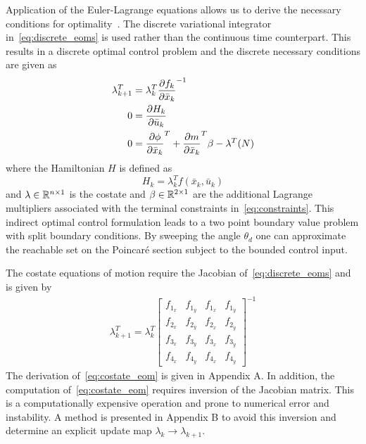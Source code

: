 \documentclass[letterpaper, preprint, paper,11pt]{AAS}	%
\begin{document}
Application of the Euler-Lagrange equations allows us to derive the necessary conditions for optimality~\cite{bryson1975}.
The discrete variational integrator in~\cref{eq:discrete_eoms} is used rather than the continuous time counterpart. 
This results in a discrete optimal control problem and the discrete necessary conditions are given as
\begin{subequations}\label{eq:necc_cond}
\begin{align}
	\lambda_{k+1}^T &= \lambda_k^T  \frac{\partial f_k}{\partial \bar{x}_k}^{-1} \\
	0 &=  \frac{\partial H_k}{\partial \bar{u}_k} \\
	0 &= \frac{\partial \phi}{\partial \bar{x}_k}^T + \frac{\partial m}{\partial \bar{x}_k}^T\beta  - \lambda^T(N)  
\end{align}
\end{subequations}
where the Hamiltonian \(H\) is defined as
\begin{equation}
	H_k = \lambda_k^T f(\bar{x}_k, \bar{u}_k) 
	\label{eq:hamiltonian_opt}
\end{equation}
and \(\lambda \in \mathbb{R}^{n \times 1}\) is the costate and \(\beta \in \mathbb{R}^{2 \times 1} \) are the additional Lagrange multipliers associated with the terminal constraints in~\cref{eq:constraints}.
This indirect optimal control formulation leads to a two point boundary value problem with split boundary conditions. 
By sweeping the angle \( \theta_d \) one can approximate the reachable set on the Poincar\'e section subject to the bounded control input. 

The costate equations of motion require the Jacobian of~\cref{eq:discrete_eoms} and is given by
\begin{align}\label{eq:costate_eom}
	\lambda_{k+1}^T = \lambda_k^T
	\begin{bmatrix} 
		f_{1_x} & f_{1_y} & f_{1_{\dot{x}}} & f_{1_{\dot{y}}} \\
		f_{2_x} & f_{2_y} & f_{2_{\dot{x}}} & f_{2_{\dot{y}}} \\
		f_{3_x} & f_{3_y} & f_{3_{\dot{x}}} & f_{3_{\dot{y}}} \\
		f_{4_x} & f_{4_y} & f_{4_{\dot{x}}} & f_{4_{\dot{y}}}
	\end{bmatrix} ^ {-1}
\end{align}
The derivation of~\cref{eq:costate_eom} is given in Appendix A.
In addition, the computation of~\cref{eq:costate_eom} requires inversion of the Jacobian matrix.
This is a computationally expensive operation and prone to numerical error and instability.
A method is presented in Appendix B to avoid this inversion and determine an explicit update map \( \lambda_k \to \lambda_{k+1} \).
\end{document}
